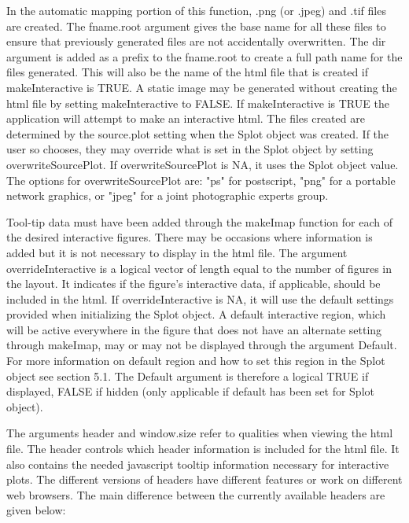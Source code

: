 \documentclass[]{article}
\begin{document}
\indent In the automatic mapping portion of this function, .png (or .jpeg) and .tif files are created. The fname.root argument gives the base name for all these files to ensure that previously generated files are not accidentally overwritten. The dir argument is added as a prefix to the fname.root to create a full path name for the files generated. This will also be the name of the html file that is created if makeInteractive is TRUE. A static image may be generated without creating the html file by setting makeInteractive to FALSE. If makeInteractive is TRUE the application will attempt to make an interactive html. The files created are determined by the source.plot setting when the Splot object was created. If the user so chooses, they may override what is set in the Splot object by setting overwriteSourcePlot. If overwriteSourcePlot is NA, it uses the Splot object value. The options for overwriteSourcePlot are:  "ps" for postscript, "png" for a portable network graphics, or "jpeg" for a joint photographic experts group. \newline

\indent Tool-tip data must have been added through the makeImap function for each of the desired interactive figures. There may be occasions where information is added but it is not necessary to display in the html file. The argument overrideInteractive is a logical vector of length equal to the number of figures in the layout. It indicates if the figure's interactive data, if applicable, should be included in the html. If overrideInteractive is NA, it will use the default settings provided when initializing the Splot object. A default interactive region, which will be active everywhere in the figure that does not have an alternate setting through makeImap, may or may not be displayed through the argument Default. For more information on default region and how to set this region in the Splot object see section 5.1. The Default argument is therefore a logical TRUE if displayed, FALSE if hidden (only applicable if default has been set for Splot object). \newline

\indent The arguments header and window.size refer to qualities when viewing the html file. The header controls which header information is included for the html file. It also contains the needed javascript tooltip information necessary for interactive plots. The different versions of headers have different features or work on different web browsers. The main difference between the currently available headers are given below:
\end{document}

